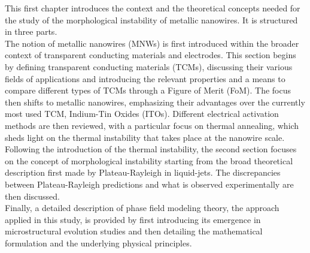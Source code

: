 
This first chapter introduces the context and the theoretical concepts needed for the study of the morphological instability of metallic nanowires. It is structured in three parts.\\
The notion of metallic nanowires (MNWs) is first introduced within the broader context of transparent conducting materials and electrodes. This section begins by defining transparent conducting materials (TCMs), discussing their various fields of applications and introducing the relevant properties and a means to compare different types of TCMs through a Figure of Merit (FoM). The focus then shifts to metallic nanowires, emphasizing their advantages over the currently most used TCM, Indium-Tin Oxides (ITOs). Different electrical activation methods are then reviewed, with a particular focus on thermal annealing, which sheds light on the thermal instability that takes place at the nanowire scale.\\
Following the introduction of the thermal instability, the second section focuses on the concept of morphological instability starting from the broad theoretical description first made by Plateau-Rayleigh in liquid-jets. The discrepancies between Plateau-Rayleigh predictions and what is observed experimentally are then discussed.\\
Finally, a detailed description of phase field modeling theory, the approach applied in this study, is provided by first introducing its emergence in microstructural evolution studies and then detailing the mathematical formulation and the underlying physical principles.
